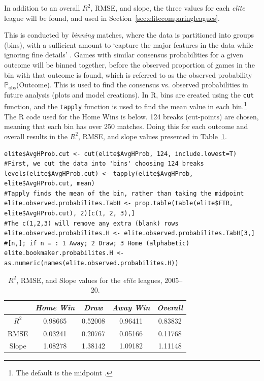 \documentclass[a4paper,10pt]{report}
\begin{document}
In addition to an overall $R^2$, RMSE, and slope, the three values for each \textit{elite} league will be found, and used in Section~\ref{sec:elitecomparingleagues}. 

This is conducted by \textit{binning} matches, where the data is partitioned into groups (bins), with a sufficient amount to `capture the major features in the data while ignoring fine details' \autocite{knuth06}. Games with similar consensus probabilities for a given outcome will be binned together, before the observed proportion of games in the bin with that outcome is found, which is referred to as the observed probability $\mathbb{P}_{\textrm{obs}}$(Outcome). This is used to find the consensus vs. observed probabilities in future analysis (plots and model creations). In R, bins are created using the \lstinline|cut| function, and the \lstinline|tapply| function is used to find the mean value in each bin.\footnote{The default is the midpoint \autocite{cutdocumentation}.} The R code used for the Home Wins is below. 124 breaks (cut-points) are chosen, meaning that each bin has over 250 matches. Doing this for each outcome and overall results in the $R^2$, RMSE, and slope values presented in Table~\ref{tab:overallrsqrmse}.

\begin{lstlisting}
elite$AvgHProb.cut <- cut(elite$AvgHProb, 124, include.lowest=T)
#First, we cut the data into 'bins' choosing 124 breaks
levels(elite$AvgHProb.cut) <- tapply(elite$AvgHProb, elite$AvgHProb.cut, mean)
#Tapply finds the mean of the bin, rather than taking the midpoint
elite.observed.probabilites.TabH <- prop.table(table(elite$FTR, elite$AvgHProb.cut), 2)[c(1, 2, 3),]
#The c(1,2,3) will remove any extra (blank) rows
elite.observed.probabilites.H <- elite.observed.probabilites.TabH[3,] 
#[n,]; if n = : 1 Away; 2 Draw; 3 Home (alphabetic)
elite.bookmaker.probabilites.H <- as.numeric(names(elite.observed.probabilites.H))
\end{lstlisting}

\begin{table}[h!]\begin{center}\begin{tabular}[h!]{c||c|c|c||c}
		&\textit{Home Win}	& \textit{Draw}	&\textit{Away Win}	&\textit{Overall}\\\hline\hline 
$R^2$ 	& 0.98665 			& 0.52008 		& 0.96411 			& 0.83832 \\
RMSE 	& 0.03241 			& 0.20767 		& 0.05166 			& 0.11768 \\
Slope	& 1.08278			& 1.38142		& 1.09182			& 1.11148
\end{tabular}\end{center}\caption{$R^2$, RMSE, and Slope values for the \textit{elite} leagues, 2005--20.}\label{tab:overallrsqrmse}
\end{table}
\end{document}
